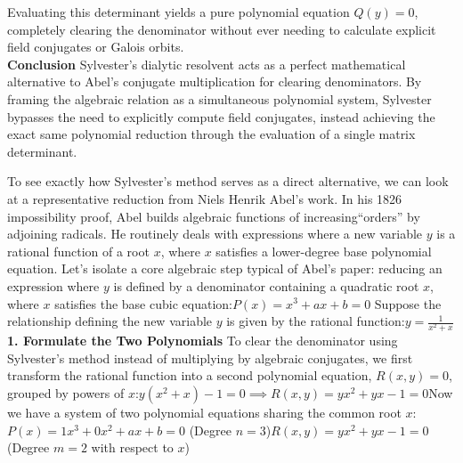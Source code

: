 Evaluating this determinant yields a pure polynomial equation \(Q(y) = 0\), completely clearing the denominator without ever needing to calculate explicit field conjugates or Galois orbits.\\

{\bf Conclusion}
Sylvester's dialytic resolvent acts as a perfect mathematical alternative to Abel's conjugate multiplication for clearing denominators. 
By framing the algebraic relation as a simultaneous polynomial system, Sylvester bypasses the need to explicitly compute field conjugates, instead achieving the exact same polynomial reduction through the evaluation of a single matrix determinant.

To see exactly how Sylvester's method serves as a direct alternative, we can look at a representative reduction from Niels Henrik Abel's work.
In his 1826 impossibility proof, Abel builds algebraic functions of increasing``orders'' by adjoining radicals. 
He routinely deals with expressions where a new variable \(y\) is a rational function of a root \(x\), where \(x\) satisfies a lower-degree base polynomial equation.
Let's isolate a core algebraic step typical of Abel's paper: reducing an expression where \(y\) is defined by a denominator containing a quadratic root \(x\), where \(x\) satisfies the base cubic equation:\(P(x)=x^{3}+ax+b=0\)
Suppose the relationship defining the new variable \(y\) is given by the rational function:\(y=\frac{1}{x^{2}+x}\) \\

{\bf 1. Formulate the Two Polynomials}
To clear the denominator using Sylvester's method instead of multiplying by algebraic conjugates, 
we first transform the rational function into a second polynomial equation, \(R(x, y) = 0\), grouped by powers of \(x\):\(y(x^{2}+x)-1=0\implies R(x,y)=yx^{2}+yx-1=0\)Now we have a system of two polynomial equations sharing the common 
root \(x\):\(P(x) = 1x^3 + 0x^2 + ax + b = 0\)  
(Degree \(n = 3\))\(R(x, y) = yx^2 + yx - 1 = 0\) (Degree \(m = 2\) with respect to \(x\)) \\

